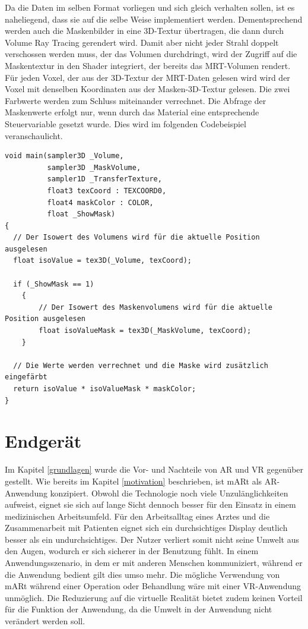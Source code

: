 Da die Daten im selben Format vorliegen und sich gleich verhalten sollen, ist es naheliegend, dass sie auf die selbe Weise implementiert werden. Dementsprechend werden auch die Maskenbilder in eine 3D-Textur übertragen, die dann durch Volume Ray Tracing gerendert wird. Damit aber nicht jeder Strahl doppelt verschossen werden muss, der das Volumen durchdringt, wird der Zugriff auf die Maskentextur in den Shader integriert, der bereits das MRT-Volumen rendert. Für jeden Voxel, der aus der 3D-Textur der MRT-Daten gelesen wird wird  der Voxel mit denselben Koordinaten aus der Masken-3D-Textur gelesen. Die zwei Farbwerte werden zum Schluss miteinander verrechnet. Die Abfrage der Maskenwerte erfolgt nur, wenn durch das Material eine entsprechende Steuervariable gesetzt wurde.
Dies wird im folgenden Codebeispiel veranschaulicht.

\begin{verbatim}
void main(sampler3D _Volume,
		  sampler3D _MaskVolume,
          sampler1D _TransferTexture,
          float3 texCoord : TEXCOORD0,
          float4 maskColor : COLOR,
          float _ShowMask)
{
  // Der Isowert des Volumens wird für die aktuelle Position ausgelesen
  float isoValue = tex3D(_Volume, texCoord);
  
  if (_ShowMask == 1)
	{
		// Der Isowert des Maskenvolumens wird für die aktuelle Position ausgelesen
		float isoValueMask = tex3D(_MaskVolume, texCoord);
	}
	
  // Die Werte werden verrechnet und die Maske wird zusätzlich eingefärbt
  return isoValue * isoValueMask * maskColor;
}
\end{verbatim}

\section{Endgerät}

Im Kapitel \ref{grundlagen} wurde die Vor- und Nachteile von AR und VR gegenüber gestellt.
Wie bereits im Kapitel \ref{motivation} beschrieben, ist mARt als AR-Anwendung konzipiert. Obwohl die Technologie noch viele Unzulänglichkeiten aufweist, eignet sie sich auf lange Sicht dennoch besser für den Einsatz in einem medizinischen Arbeitsumfeld.
Für den Arbeitsalltag eines Arztes und die Zusammenarbeit mit Patienten eignet sich ein durchsichtiges Display deutlich besser als ein undurchsichtiges. Der Nutzer verliert somit nicht seine Umwelt aus den Augen, wodurch er sich sicherer in der Benutzung fühlt. In einem Anwendungsszenario, in dem er mit anderen Menschen kommuniziert, während er die Anwendung bedient gilt dies umso mehr. Die mögliche Verwendung von mARt während einer Operation oder Behandlung wäre mit einer VR-Anwendung unmöglich. Die Reduzierung auf die virtuelle Realität bietet zudem keinen Vorteil für die Funktion der Anwendung, da die Umwelt in der Anwendung nicht verändert werden soll. 


